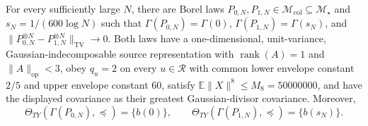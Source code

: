 For every sufficiently large \(N\), there are Borel laws \(P_{0,N},P_{1,N}\in\mathcal M_{\mathrm{col}}\subseteq\mathcal M_\star\) and \(s_N=1/(600\log N)\) such that \(\Gamma(P_{0,N})=\Gamma(0)\), \(\Gamma(P_{1,N})=\Gamma(s_N)\), and \(\|P_{0,N}^{\otimes N}-P_{1,N}^{\otimes N}\|_{\mathrm{TV}}\to0\).  Both laws have a one-dimensional, unit-variance, Gaussian-indecomposable source representation with \(\operatorname{rank}(A)=1\) and \(\|A\|_{\mathrm{op}}<3\), obey \(q_u=2\) on every \(u\in\mathcal R\) with common lower envelope constant \(2/5\) and upper envelope constant \(60\), satisfy \(\mathbb E\|X\|^8\le M_8=50000000\), and have the displayed covariance as their greatest Gaussian-divisor covariance.  Moreover,
\[
 \Theta_{TY}(\Gamma(P_{0,N}),\preceq)=\{b(0)\},\qquad
 \Theta_{TY}(\Gamma(P_{1,N}),\preceq)=\{b(s_N)\}.
\]
